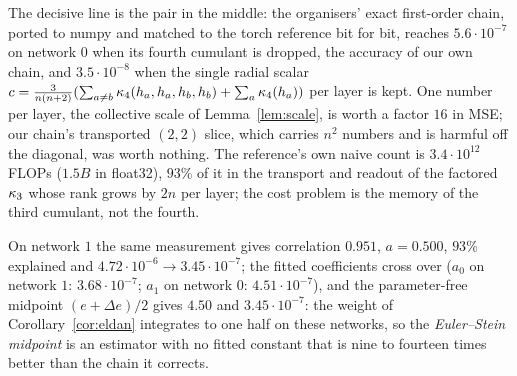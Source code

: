 The decisive line is the pair in the middle: the organisers' exact first-order chain, ported to numpy and matched
to the torch reference bit for bit, reaches $5.6\cdot10^{-7}$ on network $0$ when its fourth cumulant is dropped,
the accuracy of our own chain, and $3.5\cdot10^{-8}$ when the single radial scalar
$c=\tfrac{3}{n(n+2)}(\sum_{a\ne b}\kappa_4(h_a,h_a,h_b,h_b)+\sum_a\kappa_4(h_a))$ per layer is kept. One number per layer,
the collective scale of Lemma~\ref{lem:scale}, is worth a factor $16$ in MSE; our chain's transported $(2,2)$ slice,
which carries $n^2$ numbers and is harmful off the diagonal, was worth nothing. The reference's own naive count is
$3.4\cdot10^{12}$ FLOPs ($1.5B$ in float32), $93\%$ of it in the transport and readout of the factored $\kappa_3$ whose rank
grows by $2n$ per layer; the cost problem is the memory of the third cumulant, not the fourth.

On network $1$ the same measurement gives correlation $0.951$, $a=0.500$, $93\%$ explained and
$4.72\cdot10^{-6}\to3.45\cdot10^{-7}$; the fitted coefficients cross over ($a_0$ on network $1$: $3.68\cdot10^{-7}$;
$a_1$ on network $0$: $4.51\cdot10^{-7}$), and the parameter-free midpoint $(e+\Delta e)/2$ gives $4.50$ and
$3.45\cdot10^{-7}$: the weight of Corollary~\ref{cor:eldan} integrates to one half on these networks, so the
\emph{Euler--Stein midpoint} is an estimator with no fitted constant that is nine to fourteen times better than the
chain it corrects.

